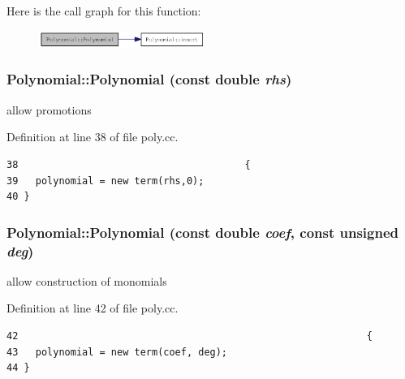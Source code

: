Here is the call graph for this function:\nopagebreak
\begin{figure}[H]
\begin{center}
\leavevmode
\includegraphics[width=154pt]{classPolynomial_fa571a95bc93973b6727e4bdbda7a43d_cgraph}
\end{center}
\end{figure}
\hypertarget{classPolynomial_91d11d1fc330f36c78de3527692e5bf2}{
\subsubsection[Polynomial]{\setlength{\rightskip}{0pt plus 5cm}Polynomial::Polynomial (const double {\em rhs})}}
\label{classPolynomial_91d11d1fc330f36c78de3527692e5bf2}


allow promotions 

Definition at line 38 of file poly.cc.

\begin{Code}\begin{verbatim}38                                       {
39   polynomial = new term(rhs,0);
40 }
\end{verbatim}
\end{Code}


\hypertarget{classPolynomial_2fdf4061d1783d216de7a6c24768cef0}{
\subsubsection[Polynomial]{\setlength{\rightskip}{0pt plus 5cm}Polynomial::Polynomial (const double {\em coef}, \/  const unsigned {\em deg})}}
\label{classPolynomial_2fdf4061d1783d216de7a6c24768cef0}


allow construction of monomials 

Definition at line 42 of file poly.cc.

\begin{Code}\begin{verbatim}42                                                            {
43   polynomial = new term(coef, deg);
44 }
\end{verbatim}
\end{Code}




